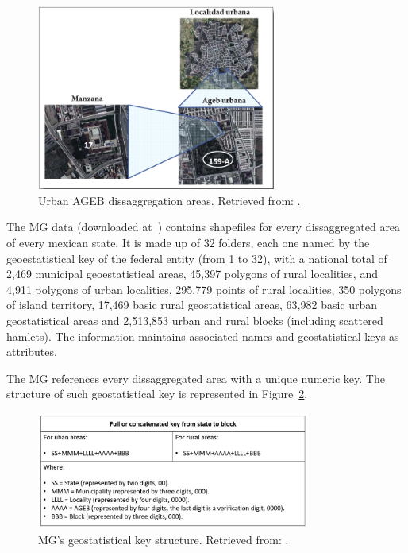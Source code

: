 \begin{figure}[htpb]
  \centering
  \includegraphics[width=0.7\textwidth]{Figures/ageb_division.png}
  \caption{Urban AGEB dissaggregation areas. Retrieved from: \cite{manualMGN}.
    \label{fig:ageb_division}}
\end{figure}

The MG data (downloaded at~\cite{MG_data}) contains shapefiles for every dissaggregated area of every mexican state. It is made up of 32 folders, each one named by the geoestatistical key of the federal entity (from 1 to 32), with a national total of 2,469 municipal geoestatistical areas, 45,397 polygons of rural localities, and 4,911 polygons of urban localities, 295,779 points of rural localities, 350 polygons of island territory, 17,469 basic rural geostatistical areas, 63,982 basic urban geostatistical areas and 2,513,853 urban and rural blocks (including scattered hamlets). The information maintains associated names and geostatistical keys as attributes.

The MG references every dissaggregated area with a unique numeric key. The structure of such geostatistical key is represented in Figure~\ref{fig:key_structure}.

\begin{figure}[htpb]
  \centering
  \includegraphics[width=0.8\textwidth]{Figures/key_structure.jpg}
  \caption{MG's geostatistical key structure. Retrieved from: \cite{manualMGN}.
    \label{fig:key_structure}}
\end{figure}

